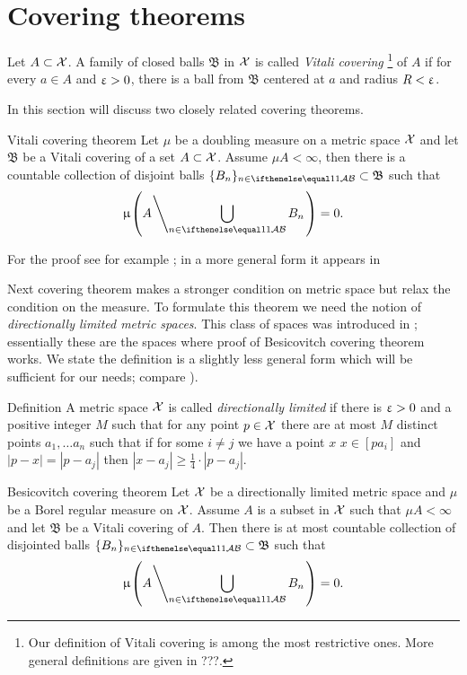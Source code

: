 \section{Covering theorems}

Let $A\subset \spc{X}$.
A family of closed balls $\mathfrak{B}$ in $\mathcal{X}$ is called 
\emph{Vitali covering}%
\footnote{Our definition of Vitali covering is among the most restrictive ones. More general definitions are given in ???.}
of $A$ if for every $a\in A$ and $\upvarepsilon > 0$, 
there is a ball from $\mathfrak{B}$ 
centered at $a$ and 
radius $R<\upvarepsilon$.

In this section will discuss two closely related covering theorems.

\begin{thm}{Vitali covering theorem}\label{thm:vitali}
Let 
$\mu$ be a doubling measure on a metric space $\mathcal{X}$
and let
$\mathfrak{B}$ be a Vitali covering
of a set $A\subset \spc{X}$.
Assume $\mu A<\infty$,
then there is a countable collection of disjoint balls 
$\{B_n\}_{n\in\IndexSet}\subset\mathfrak{B}$ such that
$$\mu\l(A\l\backslash\bigcup_{n\in\IndexSet}B_n\r.\r)=0.$$
\end{thm}

For the proof see for example \cite[Theorem 1.6]{heinonen};
in a more general form it appears in \cite[Section 2.8]{federer}

Next covering theorem makes a stronger condition on metric space
but relax the condition on the measure.
To formulate this theorem we need 
the notion of \emph{directionally limited metric spaces}.
This class of spaces was introduced in \cite[2.8.9]{federer};
essentially these are the spaces where proof of Besicovitch covering theorem
works.
We state the definition is a slightly less general form which will be sufficient for our needs;
compare \cite[page 7]{heinonen}).

\begin{thm}{Definition}\label{def:directionally-limited}
A metric space $\mathcal{X}$
is called \emph{directionally limited}
if there is $\upvarepsilon>0$ and a positive integer $M$
such that for any point $p\in \spc{X}$
there are at most $M$ distinct points $a_1,\dots a_n$
such that if for some $i\ne j$ we have a point $x$ 
$x\in [pa_i]$ and $|p-x|=|p-a_j|$
then $|x-a_j|\ge\tfrac14\cdot|p-a_j|$.
\end{thm}
 



\begin{thm}{Besicovitch covering theorem}
Let $\mathcal{X}$ be a directionally limited metric space 
and $\mu$ be a Borel regular measure on $\mathcal{X}$.
Assume $A$ is a subset in $\mathcal{X}$ such that $\mu A<\infty$
and let $\mathfrak{B}$ be a Vitali covering of $A$.
Then there is at most countable collection of disjointed balls 
$\{B_n\}_{n\in\IndexSet}\subset\mathfrak{B}$ such that
$$\mu\l(A\l\backslash\bigcup_{n\in\IndexSet}B_n\r.\r)=0.$$

\end{thm}

